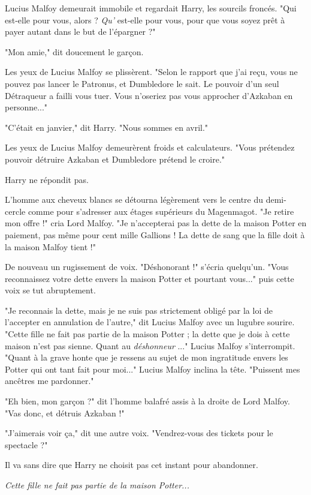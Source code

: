 Lucius Malfoy demeurait immobile et regardait Harry, les sourcils froncés. "Qui est-elle pour vous, alors ? \emph{Qu'} est-elle pour vous, pour que vous soyez prêt à payer autant dans le but de l'épargner ?"

"Mon amie," dit doucement le garçon.

Les yeux de Lucius Malfoy se plissèrent. "Selon le rapport que j'ai reçu, vous ne pouvez pas lancer le Patronus, et Dumbledore le sait. Le pouvoir d'un seul Détraqueur a failli vous tuer. Vous n'oseriez pas vous approcher d'Azkaban en personne..."

"C'était en janvier," dit Harry. "Nous sommes en avril."

Les yeux de Lucius Malfoy demeurèrent froids et calculateurs. "Vous prétendez pouvoir détruire Azkaban et Dumbledore prétend le croire."

Harry ne répondit pas.

L'homme aux cheveux blancs se détourna légèrement vers le centre du demi-cercle comme pour s'adresser aux étages supérieurs du Magenmagot. "Je retire mon offre !" cria Lord Malfoy. "Je n'accepterai pas la dette de la maison Potter en paiement, pas même pour cent mille Gallions ! La dette de sang que la fille doit à la maison Malfoy tient !"

De nouveau un rugissement de voix. "Déshonorant !" s'écria quelqu'un. "Vous reconnaissez votre dette envers la maison Potter et pourtant vous..." puis cette voix se tut abruptement.

"Je reconnais la dette, mais je ne suis pas strictement obligé par la loi de l'accepter en annulation de l'autre," dit Lucius Malfoy avec un lugubre sourire. "Cette fille ne fait pas partie de la maison Potter ; la dette que je dois à cette maison n'est pas sienne. Quant au \emph{déshonneur} ..." Lucius Malfoy s'interrompit. "Quant à la grave honte que je ressens au sujet de mon ingratitude envers les Potter qui ont tant fait pour moi..." Lucius Malfoy inclina la tête. "Puissent mes ancêtres me pardonner."

"Eh bien, mon garçon ?" dit l'homme balafré assis à la droite de Lord Malfoy. "Vas donc, et détruis Azkaban !"

"J'aimerais voir ça," dit une autre voix. "Vendrez-vous des tickets pour le spectacle ?"

Il va sans dire que Harry ne choisit pas cet instant pour abandonner.

\emph{Cette fille ne fait pas partie de la maison Potter...} 


